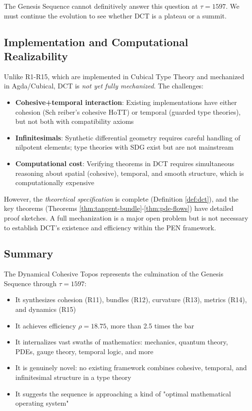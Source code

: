 \documentclass[11pt]{article}
\theoremstyle{definition}
\begin{document}
The Genesis Sequence cannot definitively answer this question at $\tau=1597$. We must continue the evolution to see whether DCT is a plateau or a summit.

\subsection{Implementation and Computational Realizability}

Unlike R1-R15, which are implemented in Cubical Type Theory and mechanized in Agda/Cubical, DCT is \emph{not yet fully mechanized}. The challenges:

\begin{itemize}
\item \textbf{Cohesive+temporal interaction}: Existing implementations have either cohesion (Sch reiber's cohesive HoTT) or temporal (guarded type theories), but not both with compatibility axioms

\item \textbf{Infinitesimals}: Synthetic differential geometry requires careful handling of nilpotent elements; type theories with SDG exist but are not mainstream

\item \textbf{Computational cost}: Verifying theorems in DCT requires simultaneous reasoning about spatial (cohesive), temporal, and smooth structure, which is computationally expensive
\end{itemize}

However, the \emph{theoretical specification} is complete (Definition \ref{def:dct}), and the key theorems (Theorems \ref{thm:tangent-bundle}-\ref{thm:pde-flows}) have detailed proof sketches. A full mechanization is a major open problem but is not necessary to establish DCT's existence and efficiency within the PEN framework.

\subsection{Summary}

The Dynamical Cohesive Topos represents the culmination of the Genesis Sequence through $\tau=1597$:
\begin{itemize}
\item It synthesizes cohesion (R11), bundles (R12), curvature (R13), metrics (R14), and dynamics (R15)
\item It achieves efficiency $\rho=18.75$, more than 2.5 times the bar
\item It internalizes vast swaths of mathematics: mechanics, quantum theory, PDEs, gauge theory, temporal logic, and more
\item It is genuinely novel: no existing framework combines cohesive, temporal, and infinitesimal structure in a type theory
\item It suggests the sequence is approaching a kind of "optimal mathematical operating system"
\end{itemize}
\end{document}
